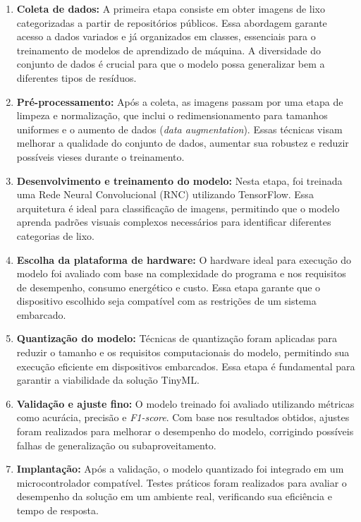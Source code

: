 \documentclass[repeatfields,xlists,xpacks,oneside]{ufrgscca}
\begin{document}
\begin{enumerate}
    \item \textbf{Coleta de dados:}  
    A primeira etapa consiste em obter imagens de lixo categorizadas a partir de repositórios públicos. Essa abordagem garante acesso a dados variados e já organizados em classes, essenciais para o treinamento de modelos de aprendizado de máquina. A diversidade do conjunto de dados é crucial para que o modelo possa generalizar bem a diferentes tipos de resíduos.
    
    \item \textbf{Pré-processamento:}  
    Após a coleta, as imagens passam por uma etapa de limpeza e normalização, que inclui o redimensionamento para tamanhos uniformes e o aumento de dados (\textit{data augmentation}). Essas técnicas visam melhorar a qualidade do conjunto de dados, aumentar sua robustez e reduzir possíveis vieses durante o treinamento.
    
    \item \textbf{Desenvolvimento e treinamento do modelo:}  
    Nesta etapa, foi treinada uma Rede Neural Convolucional (RNC) utilizando TensorFlow. Essa arquitetura é ideal para classificação de imagens, permitindo que o modelo aprenda padrões visuais complexos necessários para identificar diferentes categorias de lixo.
    
    \item \textbf{Escolha da plataforma de hardware:}  
    O hardware ideal para execução do modelo foi avaliado com base na complexidade do programa e nos requisitos de desempenho, consumo energético e custo. Essa etapa garante que o dispositivo escolhido seja compatível com as restrições de um sistema embarcado.
    
    \item \textbf{Quantização do modelo:}  
    Técnicas de quantização foram aplicadas para reduzir o tamanho e os requisitos computacionais do modelo, permitindo sua execução eficiente em dispositivos embarcados. Essa etapa é fundamental para garantir a viabilidade da solução TinyML.
    
    \item \textbf{Validação e ajuste fino:}  
    O modelo treinado foi avaliado utilizando métricas como acurácia, precisão e \textit{F1-score}. Com base nos resultados obtidos, ajustes foram realizados para melhorar o desempenho do modelo, corrigindo possíveis falhas de generalização ou subaproveitamento.
    
    \item \textbf{Implantação:}  
    Após a validação, o modelo quantizado foi integrado em um microcontrolador compatível. Testes práticos foram realizados para avaliar o desempenho da solução em um ambiente real, verificando sua eficiência e tempo de resposta.
    

\end{enumerate}
\end{document}
